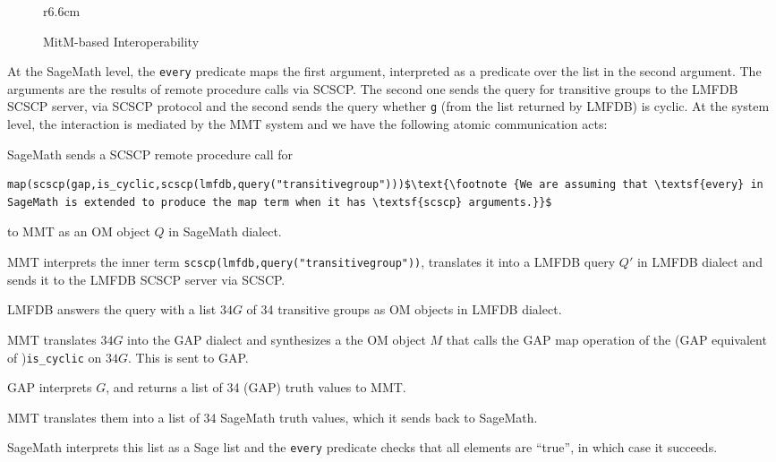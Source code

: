 \begin{wrapfigure}r{6.6cm}\vspace*{-2em}
  \vspace*{-1em}
  \caption{MitM-based Interoperability}\label{fig:mitmcomm}\vspace*{-1em}
\end{wrapfigure}
At the SageMath level, the \lstinline|every| predicate maps the first argument, interpreted as a predicate over the list in the second argument. 
The arguments are the results of remote procedure calls via SCSCP. 
The second one sends the query for transitive groups to the LMFDB SCSCP server, via SCSCP protocol and the second sends the query whether \lstinline|g| (from the list returned by LMFDB) is cyclic.
At the system level, the interaction is mediated by the MMT system and we have the following atomic communication acts: 
\begin{compactenum}
\item SageMath sends a SCSCP remote procedure call for 
  \begin{lstlisting}[mathescape]
    map(scscp(gap,is_cyclic,scscp(lmfdb,query("transitivegroup")))$\text{\footnote {We are assuming that \textsf{every} in SageMath is extended to produce the map term when it has \textsf{scscp} arguments.}}$
\end{lstlisting}
  to MMT as an OM object $Q$ in SageMath dialect.  
\item MMT interprets the inner term \lstinline|scscp(lmfdb,query("transitivegroup"))|, translates it into a LMFDB query $Q'$ in LMFDB dialect and sends it to the LMFDB SCSCP server via SCSCP. 
\item LMFDB answers the query with a list $34G$ of 34 transitive groups as OM objects in LMFDB dialect.
\item MMT translates $34G$ into the GAP dialect and synthesizes a the OM object $M$ that calls the GAP map operation of the (GAP equivalent of )\lstinline|is_cyclic| on $34G$. This is sent to GAP. 
\item GAP interprets $G$, and returns a list of 34 (GAP) truth values to MMT. 
\item MMT translates them into a list of 34 SageMath truth values, which it sends back to SageMath. 
\item SageMath interprets this list as a Sage list and the \lstinline|every| predicate checks that all elements are ``true'', in which case it succeeds. 
\end{compactenum}

